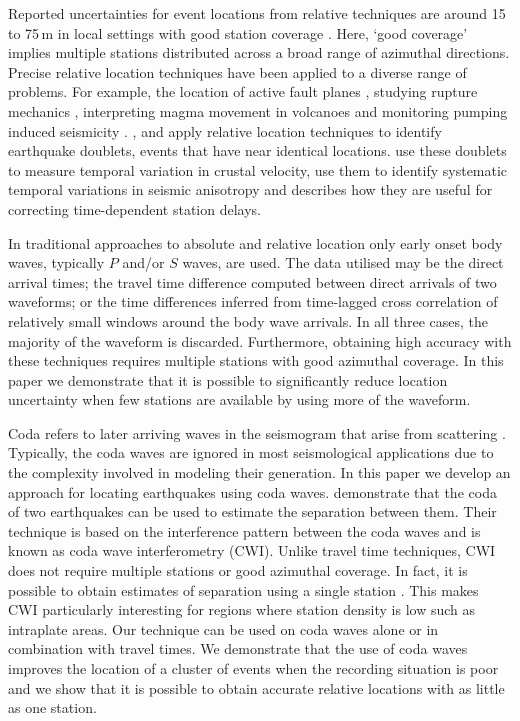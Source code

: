 \documentclass[extra]{gji}
\begin{document}
Reported uncertainties
for event locations from relative techniques are  around 15 to 75\,m in
local settings with good station coverage
\citep[e.g., ][]{dr_Ito85a, dr_Got94a, dr_Waldhauser99a,dr_Waldhauser08a}.
Here, `good coverage' implies multiple
stations distributed across a broad range of azimuthal directions.
Precise relative location techniques have been applied to a
diverse range of problems. For example, the location of active
fault planes \citep[e.g., ][]{dr_Deichmann92a, dr_Got94a,
dr_Waldhauser99a, dr_Waldhauser02a, dr_Shearer05a}, studying rupture mechanics
\citep[e.g., ][]{dr_Rubin99a, dr_Rubin02a}, interpreting magma
movement in volcanoes \citep[e.g., ][]{dr_Fremont87a} and monitoring
pumping induced seismicity \citep[e.g., ][]{dr_Lees98a,
dr_Ake05a}. \citet{dr_Poupinet84a},
\citet{dr_Bokelmann00a} and  \citet{dr_Rubin02b} apply relative
location techniques to identify earthquake doublets, events that have near identical
locations. \citet{dr_Poupinet84a} use these doublets to measure
temporal variation in crustal velocity, \citet{dr_Bokelmann00a}
use them to identify systematic temporal variations in seismic
anisotropy and \citet{dr_Rubin02b} describes how they are useful for
correcting time-dependent station delays.

In traditional approaches to absolute and relative location
only early onset body waves, typically $P$ and/or $S$ waves, are used.
The data utilised may be the direct arrival times; the travel time difference computed
between direct arrivals of two waveforms; or the time differences
inferred from time-lagged cross correlation of relatively small windows
around the body wave arrivals.
 In all three cases, the majority of the
waveform is discarded. Furthermore, obtaining high accuracy with these techniques
requires multiple stations with good azimuthal coverage.
In this paper we demonstrate that it is possible to
significantly reduce location uncertainty when few stations are
available by using more of the waveform.

Coda refers to  later arriving waves in the seismogram that arise from
scattering  \citep{dr_Aki69a,dr_Snieder99a,dr_Snieder06a}.
Typically, the coda waves are ignored in most seismological
applications due to the complexity involved in modeling their
generation. In this
paper we develop an approach for locating earthquakes using coda waves.
\citet{dr_Snieder05a} demonstrate that the
coda of two earthquakes can be used to estimate the separation between
them. Their technique is based on the interference pattern between
the coda waves and is known as coda wave interferometry (CWI).
Unlike travel time techniques, CWI
 does not require multiple stations or good azimuthal coverage.
In fact, it is possible to obtain estimates of separation using a single
station \citep{dr_Robinson07b}. This makes CWI particularly interesting
for regions where station density is low such as intraplate areas.
Our technique can be used on coda waves alone or in combination with
travel times. We demonstrate that the use of coda waves improves
the location of a cluster of events when the recording situation
is poor and we show that it is possible to obtain accurate relative locations with as
little as one station.
\end{document}
